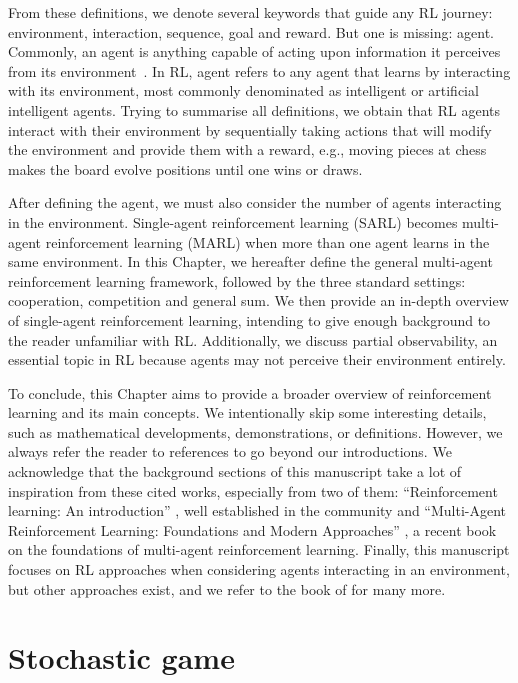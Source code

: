 From these definitions, we denote several keywords that guide any RL journey: environment, interaction, sequence, goal and reward.
But one is missing: agent.
Commonly, an agent is anything capable of acting upon information it perceives from its environment~\citep{russel2010}.
In RL, agent refers to any agent that learns by interacting with its environment, most commonly denominated as intelligent or artificial intelligent agents.
Trying to summarise all definitions, we obtain that RL agents interact with their environment by sequentially taking actions that will modify the environment and provide them with a reward, e.g., moving pieces at chess makes the board evolve positions until one wins or draws.

After defining the agent, we must also consider the number of agents interacting in the environment.
Single-agent reinforcement learning (SARL) becomes multi-agent reinforcement learning (MARL) when more than one agent learns in the same environment.
In this Chapter, we hereafter define the general multi-agent reinforcement learning framework, followed by the three standard settings: cooperation, competition and general sum.
We then provide an in-depth overview of single-agent reinforcement learning, intending to give enough background to the reader unfamiliar with RL.
Additionally, we discuss partial observability, an essential topic in RL because agents may not perceive their environment entirely.

To conclude, this Chapter aims to provide a broader overview of reinforcement learning and its main concepts.
We intentionally skip some interesting details, such as mathematical developments, demonstrations, or definitions.
However, we always refer the reader to references to go beyond our introductions.
We acknowledge that the background sections of this manuscript take a lot of inspiration from these cited works, especially from two of them: ``Reinforcement learning: An introduction'' \citep{sutton2018reinforcement}, well established in the community and ``Multi-Agent Reinforcement Learning: Foundations and Modern Approaches'' \citep{marl-book}, a recent book on the foundations of multi-agent reinforcement learning.
Finally, this manuscript focuses on RL approaches when considering agents interacting in an environment, but other approaches exist, and we refer to the book of \cite{russel2010} for many more.

\section{Stochastic game}
\label{sec:ch2_stochastic_Game}

